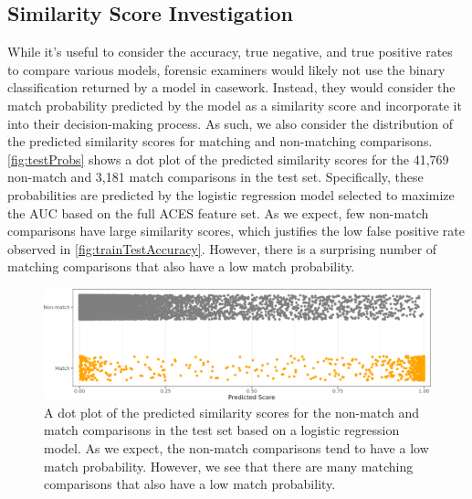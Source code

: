 \documentclass[reprint]{JASA}
\begin{document}
\hypertarget{similarity-score-investigation}{%
\subsection{Similarity Score
Investigation}\label{similarity-score-investigation}}

While it's useful to consider the accuracy, true negative, and true
positive rates to compare various models, forensic examiners would
likely not use the binary classification returned by a model in
casework. Instead, they would consider the match probability predicted
by the model as a similarity score and incorporate it into their
decision-making process. As such, we also consider the distribution of
the predicted similarity scores for matching and non-matching
comparisons. \autoref{fig:testProbs} shows a dot plot of the predicted
similarity scores for the 41,769 non-match and 3,181 match comparisons
in the test set. Specifically, these probabilities are predicted by the
logistic regression model selected to maximize the AUC based on the full
ACES feature set. As we expect, few non-match comparisons have large
similarity scores, which justifies the low false positive rate observed
in \autoref{fig:trainTestAccuracy}. However, there is a surprising
number of matching comparisons that also have a low match probability.

\begin{figure}[htbp]

{\centering \includegraphics[width=.5\textwidth]{images/resultsPlots/testProbs_plt} 

}

\caption{\label{fig:testProbs} A dot plot of the predicted similarity scores for the non-match and match comparisons in the test set based on a logistic regression model. As we expect, the non-match comparisons tend to have a low match probability. However, we see that there are many matching comparisons that also have a low match probability.}\label{fig:unnamed-chunk-10}
\end{figure}
\end{document}
